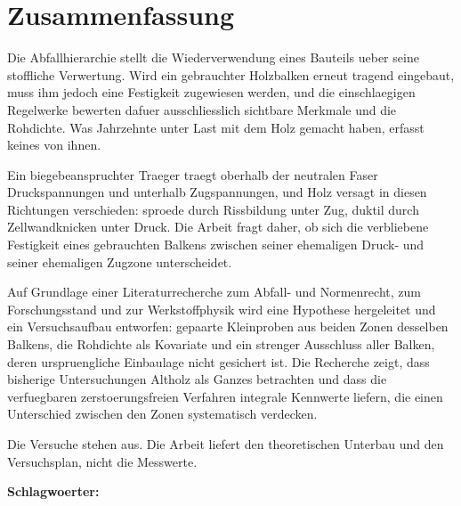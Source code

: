 \chapter*{Zusammenfassung}

Die Abfallhierarchie stellt die Wiederverwendung eines Bauteils ueber seine
stoffliche Verwertung. Wird ein gebrauchter Holzbalken erneut tragend
eingebaut, muss ihm jedoch eine Festigkeit zugewiesen werden, und die
einschlaegigen Regelwerke bewerten dafuer ausschliesslich sichtbare Merkmale
und die Rohdichte. Was Jahrzehnte unter Last mit dem Holz gemacht haben,
erfasst keines von ihnen.

Ein biegebeanspruchter Traeger traegt oberhalb der neutralen Faser
Druckspannungen und unterhalb Zugspannungen, und Holz versagt in diesen
Richtungen verschieden: sproede durch Rissbildung unter Zug, duktil durch
Zellwandknicken unter Druck. Die Arbeit fragt daher, ob sich die verbliebene
Festigkeit eines gebrauchten Balkens zwischen seiner ehemaligen Druck- und
seiner ehemaligen Zugzone unterscheidet.

Auf Grundlage einer Literaturrecherche zum Abfall- und Normenrecht, zum
Forschungsstand und zur Werkstoffphysik wird eine Hypothese hergeleitet und
ein Versuchsaufbau entworfen: gepaarte Kleinproben aus beiden Zonen desselben
Balkens, die Rohdichte als Kovariate und ein strenger Ausschluss aller Balken,
deren urspruengliche Einbaulage nicht gesichert ist. Die Recherche zeigt, dass
bisherige Untersuchungen Altholz als Ganzes betrachten und dass die
verfuegbaren zerstoerungsfreien Verfahren integrale Kennwerte liefern, die
einen Unterschied zwischen den Zonen systematisch verdecken.

Die Versuche stehen aus. Die Arbeit liefert den theoretischen Unterbau und den
Versuchsplan, nicht die Messwerte.

\medskip
\noindent\textbf{Schlagwoerter:} \thesisKeywords
